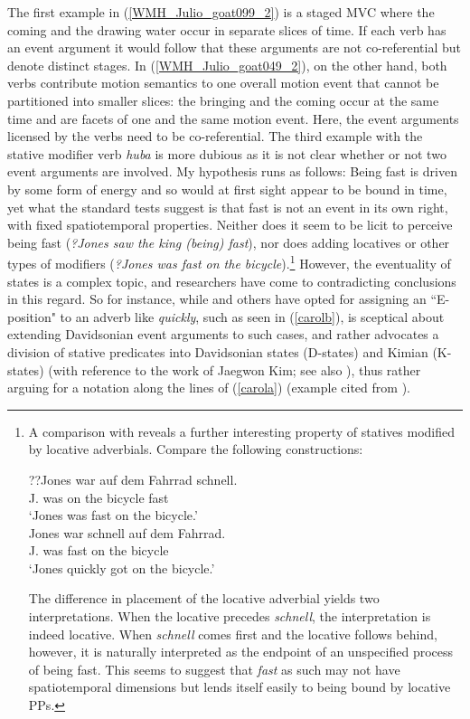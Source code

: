 The first example in (\ref{WMH_Julio_goat099_2}) is a staged MVC where the coming and the drawing water occur in separate slices of time. If each verb has an event argument it would follow that these arguments are not co-referential but denote distinct stages. In (\ref{WMH_Julio_goat049_2}), on the other hand, both verbs contribute motion semantics to one overall motion event that cannot be partitioned into smaller slices: the bringing and the coming occur at the same time and are facets of one and the same motion event. Here, the event arguments licensed by the verbs need to be co-referential. The third example with the stative modifier verb \textit{huba} is more dubious as it is not clear whether or not two event arguments are involved. My hypothesis runs as follows: Being fast is driven by some form of energy and so would at first sight appear to be bound in time, yet what the standard tests suggest is that fast is not an event in its own right, with fixed spatiotemporal properties. Neither does it seem to be licit to perceive being fast (\textit{?Jones saw the king (being) fast}), nor does adding locatives or other types of modifiers (\textit{?Jones was fast on the bicycle}).\footnote{A comparison with  reveals a further interesting property of statives modified by locative adverbials. Compare the following constructions:

\ea 
\ea
\gll ??Jones war auf dem Fahrrad schnell.\\
J. was on the bicycle fast \\
\glft `Jones was fast on the bicycle.'\\
\ex
\gll Jones war schnell auf dem Fahrrad.\\
J. was fast on the bicycle \\
\glft `Jones quickly got on the bicycle.'\\
\z
\z

The difference in placement of the locative adverbial yields two interpretations. When the locative precedes \textit{schnell}, the interpretation is indeed locative. When \textit{schnell} comes first and the locative follows behind, however, it is naturally interpreted as the endpoint of an unspecified process of being fast. This seems to suggest that \textit{fast} as such may not have spatiotemporal dimensions but lends itself easily to being bound by locative PPs.} However, the eventuality of states is a complex topic, and researchers have come to contradicting conclusions in this regard. So for instance, while \citet[355f.]{higginbotham2000events} and others have opted for assigning an ``E-position" to an adverb like \textit{quickly}, such as seen in (\ref{carolb}), \citet{maienborn2005limits} is sceptical about extending Davidsonian event arguments to such cases, and rather advocates a division of stative predicates into Davidsonian states (D-states) and Kimian (K-states) (with reference to the work of Jaegwon Kim; see also \citealt{engelberg2005kimian}), thus rather arguing for a notation along the lines of (\ref{carola}) (example cited from \citealt[312]{maienborn2005limits}).

